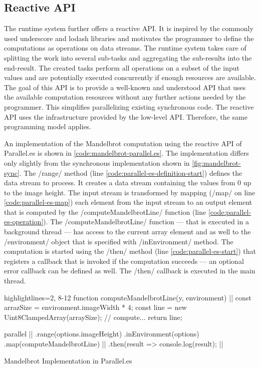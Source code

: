 \subsection{Reactive API}
The runtime system further offers a reactive API. It is inspired by the commonly used underscore and lodash libraries and motivates the programmer to define the computations as operations on data streams. The runtime system takes care of splitting the work into several sub-tasks and aggregating the sub-results into the end-result. The created tasks perform all operations on a subset of the input values and are potentially executed concurrently if enough resources are available. The goal of this API is to provide a well-known and understood API that uses the available computation resources without any further actions needed by the programmer. This simplifies parallelizing existing synchronous code. The reactive API uses the infrastructure provided by the low-level API. Therefore, the same programming model applies.


 An implementation of the Mandelbrot computation using the reactive API of Parallel.es is shown in \cref{code:mandelbrot-parallel.es}. The implementation differs only slightly from the synchronous implementation shown in \cref{fig:mandelbrot-sync}. The \javascriptinline/range/ method (line \ref{code:parallel-es-definition-start}) defines the data stream to process. It creates a data stream containing the values from 0 up to the image height. The input stream is transformed by mapping (\javascriptinline/map/ on line \ref{code:parallel-es-map}) each element from the input stream to an output element that is computed by the \javascriptinline/computeMandelbrotLine/ function (line \ref{code:parallel-es-operation}). The \javascriptinline/computeMandelbrotLine/ function --- that is executed in a background thread --- has access to the current array element and as well to the \javascriptinline/environment/ object that is specified with \javascriptinline/inEnvironment/ method. The computation is started using the \javascriptinline/then/ method (line \ref{code:parallel-es-start}) that registers a callback that is invoked if the computation succeeds --- an optional error callback can be defined as well. The \javascriptinline/then/ callback is executed in the main thread.

\begin{listing}
	\begin{javascriptcode*}{highlightlines={2, 8-12}}
function computeMandelbrotLine(y, environment) { |$\label{code:parallel-es-operation}$|
	const arrazSize = environment.imageWidth * 4;
	const line = new Uint8ClampedArray(arraySize);
	// compute...
	return line;
}

parallel      |$\label{code:parallel-es-definition-start}$|
	.range(options.imageHeight)
	.inEnvironment(options)
	.map(computeMandelbrotLine) |$\label{code:parallel-es-map}$|
	.then(result => console.log(result); |$\label{code:parallel-es-start}$|
	\end{javascriptcode*}
	
	\caption{Mandelbrot Implementation in Parallel.es}
	\label{code:mandelbrot-parallel.es}
\end{listing}


